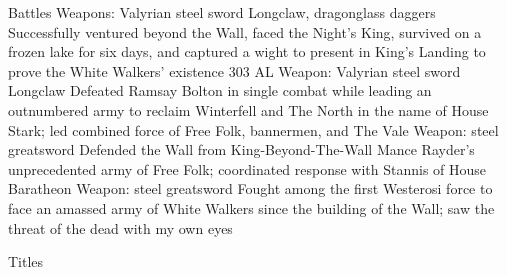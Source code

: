 \documentclass[]{resume-knyte}
\begin{document}
\begin{topic}{Battles}
    {Weapons: Valyrian steel sword Longclaw, dragonglass daggers}
    {Successfully ventured beyond the Wall, faced the Night's King,
    survived on a frozen lake for six days, and captured a wight to present
    in King's Landing to prove the White Walkers' existence}
    {303 AL}
    {Weapon: Valyrian steel sword Longclaw}
    {Defeated Ramsay Bolton in single combat while leading an outnumbered
    army to reclaim Winterfell and The North in the name of House Stark;
    led combined force of Free Folk, bannermen, and The Vale}
    {Weapon: steel greatsword}
    {Defended the Wall from King-Beyond-The-Wall Mance Rayder's unprecedented
    army of Free Folk; coordinated response with Stannis of House Baratheon}
    {Weapon: steel greatsword}
    {Fought among the first Westerosi force to face an amassed army of White
    Walkers since the building of the Wall; saw the threat of the dead with
    my own eyes}
\end{topic}

\begin{topic}{Titles}
\end{topic}
\end{document}

